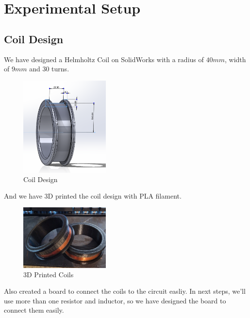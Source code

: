 \chapter{Experimental Setup}

\section{Coil Design}

We have designed a Helmholtz Coil on SolidWorks with a radius of $40mm$, width of $9mm$ and $30$ turns. 

\begin{figure}[h]
    \centering
    \includegraphics[width=0.4\textwidth]{assets/coil-design-single.png}
    \caption{Coil Design}
    \label{fig:helmholtz-coil}
\end{figure}

And we have 3D printed the coil design with PLA filament.

\begin{figure}[h]
    \centering
    \includegraphics[width=0.4\textwidth]{assets/3d-printed-coil.jpg}
    \caption{3D Printed Coils}
    \label{fig:helmholtz-coil-3d-printed}
\end{figure}

\newpage{}
\thispagestyle{plain}

Also created a board to connect the coils to the circuit easliy. In next steps, we'll use more than one resistor and inductor, so we have designed the board to connect them easily.

